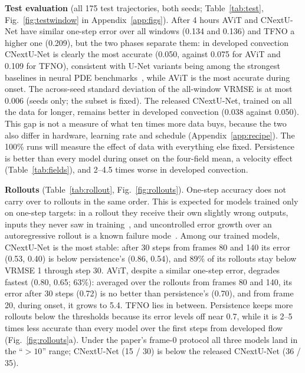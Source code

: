 \documentclass[11pt]{article}
\begin{document}
\textbf{Test evaluation} (all 175 test trajectories, both seeds; Table~\ref{tab:test}, Fig.~\ref{fig:testwindow} in Appendix~\ref{app:figs}).
After 4 hours AViT and CNextU-Net have similar one-step error over all windows (0.134 and 0.136) and TFNO a
higher one (0.209), but the two phases separate them: in developed convection CNextU-Net is clearly the most
accurate (0.050, against 0.075 for AViT and 0.109 for TFNO), consistent with U-Net variants being among the
strongest baselines in neural PDE benchmarks~\cite{gupta2022pdearena,ohana2024well}, while AViT is the most accurate during onset. The
across-seed standard deviation of the all-window VRMSE is at most 0.006 (seeds only; the subset is fixed). The
released CNextU-Net, trained on all the data for longer, remains better in developed convection (0.038 against
0.050). This gap is not a measure of what ten times more data buys, because the two also differ in hardware,
learning rate and schedule (Appendix~\ref{app:recipe}). The 100\% runs will
measure the effect of data with everything else fixed. Persistence is better than every model during onset on the four-field mean, a velocity effect
(Table~\ref{tab:fields}), and 2--4.5 times worse in developed convection.

\textbf{Rollouts} (Table~\ref{tab:rollout}, Fig.~\ref{fig:rollouts}). One-step accuracy does not carry over to
rollouts in the same order. This is expected for models trained only on one-step targets: in a rollout they receive
their own slightly wrong outputs, inputs they never saw in training~\cite{brandstetter2022mp}, and uncontrolled error
growth over an autoregressive rollout is a known failure mode~\cite{mccabe2023stability}. Among our trained models, CNextU-Net is the most stable: after 30 steps from frames 80
and 140 its error (0.53, 0.40) is below persistence's (0.86, 0.54), and 89\% of its rollouts stay below VRMSE 1
through step 30. AViT, despite a similar one-step error, degrades fastest (0.80, 0.65; 63\%): averaged over the
rollouts from frames 80 and 140, its error after 30 steps (0.72) is no better than persistence's (0.70), and from
frame 20, during onset, it grows to 5.4. TFNO lies in between. Persistence keeps more rollouts below the thresholds
because its error levels off near 0.7, while it is 2--5 times less accurate than every model over the first steps
from developed flow (Fig.~\ref{fig:rollouts}a). Under the paper's frame-0 protocol all three models land in the
``$>10$'' range; CNextU-Net (15 / 30) is below the released CNextU-Net (36 / 35).
\end{document}
